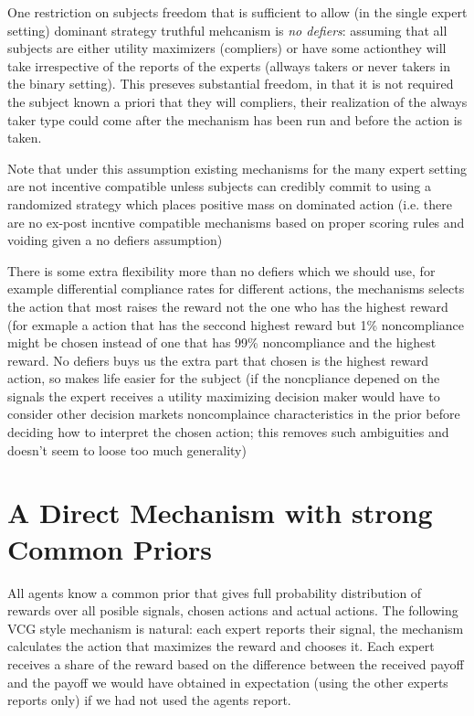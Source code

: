 One restriction on subjects freedom that is sufficient to allow (in the single expert setting) dominant strategy truthful mehcanism is \emph{no defiers}: assuming that all subjects are either utility maximizers (compliers) or have some actionthey will take irrespective of the reports of the experts (allways takers or never takers in the binary setting).
This preseves substantial freedom, in that it is not required the subject known a priori that they will compliers, their realization of the always taker type could come after the mechanism has been run and before the action is taken. 

Note that under this assumption existing mechanisms for the many expert setting are not incentive compatible unless subjects can credibly commit to using a randomized strategy which places positive mass on dominated action (i.e. there are no ex-post incntive compatible mechanisms based on proper scoring rules and voiding given a no defiers assumption)


There is some extra flexibility more than no defiers which we should use, for example differential compliance rates for different actions, the mechanisms selects the action that most raises the reward not the one who has the highest reward (for exmaple a action that has the seccond highest reward but 1\% noncompliance might be chosen instead of one  that has 99\% noncompliance and the highest reward. No defiers buys us the extra part that chosen is the highest reward action, so makes life easier for the subject (if the noncpliance depened on the signals the expert receives a utility maximizing decision maker would have to consider other decision markets noncomplaince characteristics in the prior before deciding how to interpret the chosen action; this removes such ambiguities and doesn't seem to loose too much generality)


\section{A Direct Mechanism with strong Common Priors}

All agents know a common prior that gives full probability distribution of rewards over all posible signals,  chosen actions and actual actions. 
The following VCG style mechanism is natural: each expert reports their signal, the mechanism calculates the action that maximizes the reward and chooses it. Each expert receives a share of the reward based on the difference between the received payoff and the payoff we would have obtained in expectation (using the other experts reports only) if we had not used the agents report.


